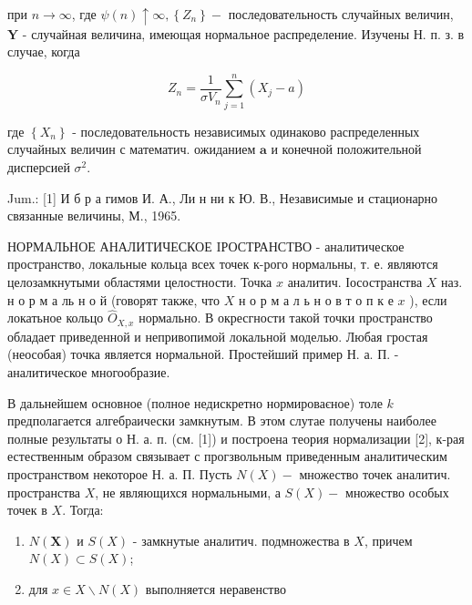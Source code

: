 \documentclass[10pt]{article}
\begin{document}
при $n \rightarrow \infty$, где $\psi(n) \uparrow \infty,\left\{Z_{n}\right\}-$ последовательность случайных величин, $\boldsymbol{Y}$ - случайная величина, имеющая нормальное распределение. Изучены Н. п. з. в случае, когда



\[

Z_{n}=\frac{1}{\sigma V_{n}} \sum_{j=1}^{n}\left(X_{j}-a\right)

\]



где $\left\{X_{n}\right\}$ - последовательность независимых одинаково распределенных случайных величин с математич. ожиданием $\boldsymbol{a}$ и конечной положительной дисперсией $\sigma^{2}$.



Jum.: [1] И б р а гимов И. А., Ли н ни к Ю. В., Независимые и стационарно связанные величины, М., 1965.



НОРМАЛЬНОЕ АНАЛИТИЧЕСКОЕ IРОСТРАНСТВО - аналитическое пространство, локальные кольца всех точек к-рого нормальны, т. е. являются целозамкнутыми областями целостности. Точка $x$ аналитич. Іосостранства $X$ наз. н о р м а ль н о й (говорят также, что $X$ н о р м а л ь н о в т о п к е $x$ ), если локатьное кольцо $\widehat{O}_{X, x}$ нормально. В окресгности такой точки пространство обладает приведенной и непривопимой локальной моделью. Любая гростая (неособая) точка является нормальной. Простейший пример Н. а. П. - аналитическое многообразие.



В дальнейшем основное (полное недискретно нормироваєное) толе $k$ предполагается алгебраически замкнутым. В этом слутае получены наиболее полные результаты о Н. а. п. (см. [1]) и построена теория нормализации [2], к-рая естественным образом связывает с прогзвольным приведенным аналитическим пространством некоторое Н. а. П. Пусть $N(X)-$ множество точек аналитич. пространства $X$, не являющихся нормальными, а $S(X)-$ множество особых точек в $X$. Тогда:



\begin{enumerate}

  \item $N(\boldsymbol{X})$ и $S(X)$ - замкнутые аналитич. подмножества в $X$, причем $N(X) \subset S(X)$;



  \item для $x \in X \backslash N(X)$ выполняется неравенство



\end{enumerate}
\end{document}
